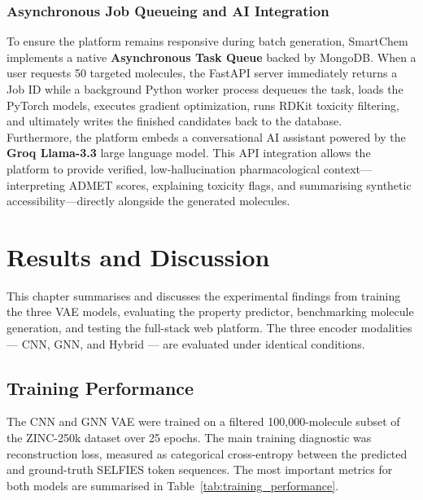 \documentclass[12pt,a4paper]{report}
\begin{document}
\subsection{Asynchronous Job Queueing and AI Integration}
To ensure the platform remains responsive during batch generation, SmartChem implements a native \textbf{Asynchronous Task Queue} backed by MongoDB. When a user requests 50 targeted molecules, the FastAPI server immediately returns a Job ID while a background Python worker process dequeues the task, loads the PyTorch models, executes gradient optimization, runs RDKit toxicity filtering, and ultimately writes the finished candidates back to the database.\\

Furthermore, the platform embeds a conversational AI assistant powered by the \textbf{Groq Llama-3.3} large language model. This API integration allows the platform to provide verified, low-hallucination pharmacological context—interpreting ADMET scores, explaining toxicity flags, and summarising synthetic accessibility—directly alongside the generated molecules.


\chapter{Results and Discussion}

This chapter summarises and discusses the experimental findings from training the three VAE models, evaluating the property predictor, benchmarking molecule generation, and testing the full-stack web platform. The three encoder modalities — CNN, GNN, and Hybrid — are evaluated under identical conditions.

\bigskip

\section{Training Performance}

The CNN and GNN VAE were trained on a filtered 100{,}000-molecule subset of the ZINC-250k dataset over 25 epochs. The main training diagnostic was reconstruction loss, measured as categorical cross-entropy between the predicted and ground-truth SELFIES token sequences. The most important metrics for both models are summarised in Table~\ref{tab:training_performance}.
\end{document}
